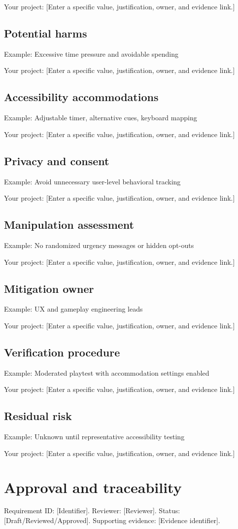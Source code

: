 \documentclass[11pt]{article}
\begin{document}
Your project: [Enter a specific value, justification, owner, and evidence link.]


\subsection{Potential harms}
Example: Excessive time pressure and avoidable spending

Your project: [Enter a specific value, justification, owner, and evidence link.]


\subsection{Accessibility accommodations}
Example: Adjustable timer, alternative cues, keyboard mapping

Your project: [Enter a specific value, justification, owner, and evidence link.]


\subsection{Privacy and consent}
Example: Avoid unnecessary user-level behavioral tracking

Your project: [Enter a specific value, justification, owner, and evidence link.]


\subsection{Manipulation assessment}
Example: No randomized urgency messages or hidden opt-outs

Your project: [Enter a specific value, justification, owner, and evidence link.]


\subsection{Mitigation owner}
Example: UX and gameplay engineering leads

Your project: [Enter a specific value, justification, owner, and evidence link.]


\subsection{Verification procedure}
Example: Moderated playtest with accommodation settings enabled

Your project: [Enter a specific value, justification, owner, and evidence link.]


\subsection{Residual risk}
Example: Unknown until representative accessibility testing

Your project: [Enter a specific value, justification, owner, and evidence link.]


\section{Approval and traceability}
Requirement ID: [Identifier]. Reviewer: [Reviewer]. Status: [Draft/Reviewed/Approved]. Supporting evidence: [Evidence identifier].
\end{document}

